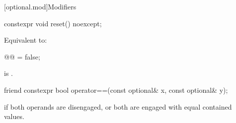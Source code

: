 [optional.mod]{Modifiers}

%
\begin{itemdecl}
constexpr void reset() noexcept;
\end{itemdecl}

\begin{itemdescr}
\pnum
\effects
Equivalent to:
\begin{codeblock}
@@ = false;
\end{codeblock}

\pnum
\ensures
{} is .
\end{itemdescr}

%
\begin{itemdecl}
friend constexpr bool operator==(const optional& x, const optional& y);
\end{itemdecl}

\begin{itemdescr}
\pnum
\returns
{} if both operands are disengaged, or both are engaged with equal contained values.
\end{itemdescr}
